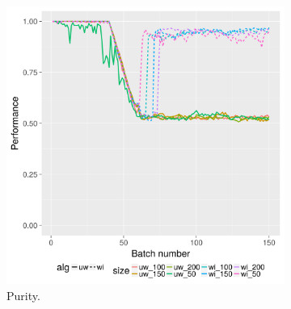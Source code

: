 
\begin{figure}[!h]
        \centering
        \begin{subfigure}[b]{0.47\textwidth}
          \includegraphics[width=\textwidth]{standard_alt/evolving_pen_48_49_standard_purity.png}   
                 \caption{Purity.}
                 \label{fig:p_4849}
        \end{subfigure}
        \begin{subfigure}[b]{0.47\textwidth}

\end{subfigure}
\end{figure}
